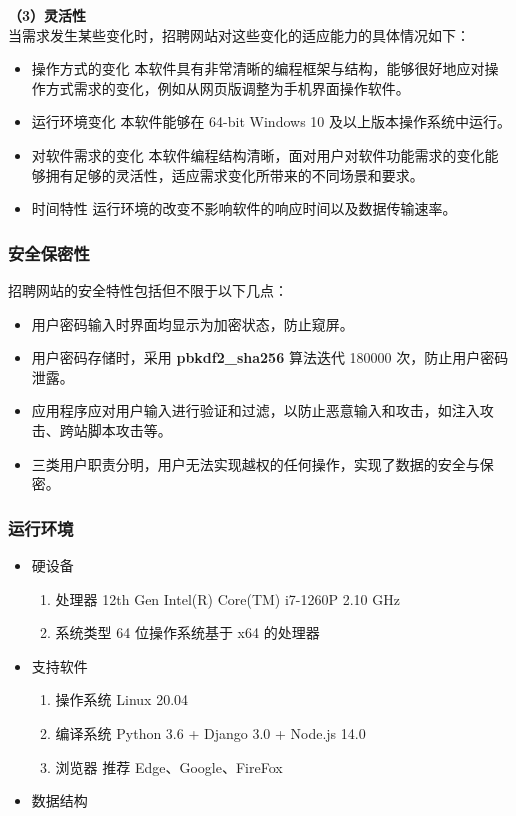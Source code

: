 \documentclass[UTF8,a4paper,10pt]{ctexart}
\begin{document}
\textbf{（3）灵活性}\\
当需求发生某些变化时，招聘网站对这些变化的适应能力的具体情况如下：

\begin{itemize}
    \item 操作方式的变化 本软件具有非常清晰的编程框架与结构，能够很好地应对操作方式需求的变化，例如从网页版调整为手机界面操作软件。
    \item 运行环境变化 本软件能够在 64-bit Windows 10 及以上版本操作系统中运行。
    \item 对软件需求的变化 本软件编程结构清晰，面对用户对软件功能需求的变化能够拥有足够的灵活性，适应需求变化所带来的不同场景和要求。
    \item 时间特性 运行环境的改变不影响软件的响应时间以及数据传输速率。
\end{itemize}

\subsubsection{安全保密性}

招聘网站的安全特性包括但不限于以下几点：
\begin{itemize}
    \item 用户密码输入时界面均显示为加密状态，防止窥屏。
    \item 用户密码存储时，采用 \textbf{pbkdf2\_sha256} 算法迭代 180000 次，防止用户密码泄露。
    \item 应用程序应对用户输入进行验证和过滤，以防止恶意输入和攻击，如注入攻击、跨站脚本攻击等。
    \item 三类用户职责分明，用户无法实现越权的任何操作，实现了数据的安全与保密。
\end{itemize}

\subsubsection{运行环境}

\begin{itemize}
    \item 硬设备
    \begin{enumerate}[label=\arabic*.]
        \item 处理器 12th Gen Intel(R) Core(TM) i7-1260P 2.10 GHz
        \item 系统类型 64 位操作系统基于 x64 的处理器
    \end{enumerate}

    \item 支持软件
    \begin{enumerate}[label=\arabic*.]
        \item 操作系统 Linux 20.04
        \item 编译系统 Python 3.6 + Django 3.0 + Node.js 14.0
        \item 浏览器 推荐 Edge、Google、FireFox
    \end{enumerate}

    \item 数据结构  
\end{itemize}
\end{document}
